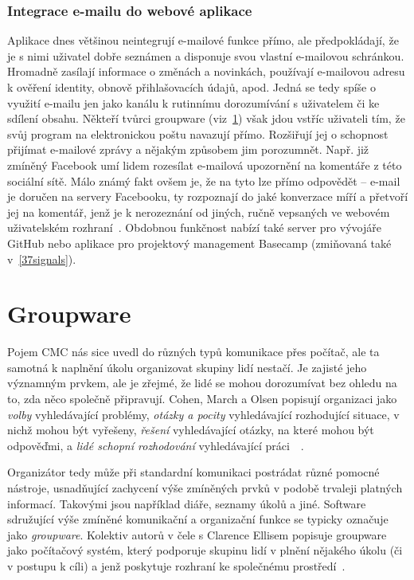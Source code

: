 \documentclass[12pt,oneside,final]{fithesis2}
\begin{document}
\subsubsection*{Integrace e-mailu do webové aplikace}\label{emailWebApp}
Aplikace dnes většinou neintegrují e-mailové funkce přímo, ale předpokládají, že je s nimi uživatel dobře seznámen a disponuje svou vlastní e-mailovou schránkou. Hromadně zasílají informace o změnách a novinkách, používají e-mailovou adresu k ověření identity, obnově přihlašovacích údajů, apod. Jedná se tedy spíše o využití e-mailu jen jako kanálu k rutinnímu dorozumívání s uživatelem či ke sdílení obsahu. Někteří tvůrci groupware (viz~\ref{groupware}) však jdou vstříc uživateli tím, že svůj program na elektronickou poštu navazují přímo. Rozšiřují jej o schopnost přijímat e-mailové zprávy a nějakým způsobem jim porozumnět. Např. již zmíněný Facebook umí lidem rozesílat e-mailová upozornění na komentáře z této sociální sítě. Málo známý fakt ovšem je, že na tyto lze přímo odpovědět -- e-mail je doručen na servery Facebooku, ty rozpoznají do jaké konverzace míří a přetvoří jej na komentář, jenž je k nerozeznání od jiných, ručně vepsaných ve webovém uživatelském rozhraní~\cite{whitnah2010replying}. Obdobnou funkčnost nabízí také server pro vývojáře GitHub nebo aplikace pro projektový management Basecamp (zmiňovaná také v~\ref{37signals}).


\section{Groupware}\label{groupware}
Pojem CMC nás sice uvedl do různých typů komunikace přes počítač, ale ta samotná k naplnění úkolu organizovat skupiny lidí nestačí. Je zajisté jeho významným prvkem, ale je zřejmé, že lidé se mohou dorozumívat bez ohledu na to, zda něco společně připravují. Cohen, March a Olsen popisují organizaci jako \emph{volby} vyhledávající problémy, \emph{otázky a pocity} vyhledávající rozhodující situace, v nichž mohou být vyřešeny, \emph{řešení} vyhledávající otázky, na které mohou být odpověďmi, a \emph{lidé schopní rozhodování} vyhledávající práci~\cite{cohen1972garbage}~\cite{grudin1994groupware}.

Organizátor tedy může při standardní komunikaci postrádat různé pomocné nástroje, usnadňující zachycení výše zmíněných prvků v podobě trvaleji platných informací. Takovými jsou například diáře, seznamy úkolů a jiné. Software sdružující výše zmíněné komunikační a organizační funkce se typicky označuje jako \emph{groupware}. Kolektiv autorů v čele s Clarence Ellisem popisuje groupware jako počítačový systém, který podporuje skupinu lidí v plnění nějakého úkolu (či v postupu k cíli) a jenž poskytuje rozhraní ke společnému prostředí~\cite{ellis1991groupware}.
\end{document}
